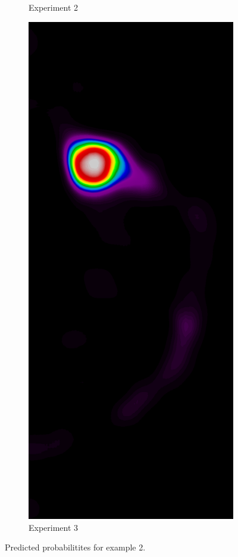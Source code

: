 \begin{figure}[h!]
\begin{subfigure}{0.195\textwidth}
		\caption{Experiment 2}
    \end{subfigure}
    \begin{subfigure}{0.195\textwidth}
		\centering
			\includegraphics[width=\textwidth]{plots/examples/example2_probs_3.png}
		\caption{Experiment 3}
    \end{subfigure}
	\caption[Predictions for example 2]{Predicted probabilitites for example 2.}
\end{figure}

